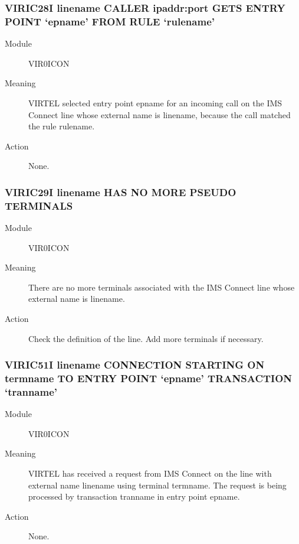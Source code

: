 \documentclass[letterpaper,10pt,english]{sphinxmanual}
\begin{document}
\subsubsection{VIRIC28I linename CALLER ipaddr:port GETS ENTRY POINT ‘epname’ FROM RULE ‘rulename’}
\label{\detokenize{messages:viric28i-linename-caller-ipaddr-port-gets-entry-point-epname-from-rule-rulename}}\begin{description}
\item[{Module}] \leavevmode
VIR0ICON

\item[{Meaning}] \leavevmode
VIRTEL selected entry point epname for an incoming call on the IMS Connect line whose external name is linename, because the call matched the rule rulename.

\item[{Action}] \leavevmode
None.

\end{description}


\subsubsection{VIRIC29I linename HAS NO MORE PSEUDO TERMINALS}
\label{\detokenize{messages:viric29i-linename-has-no-more-pseudo-terminals}}\begin{description}
\item[{Module}] \leavevmode
VIR0ICON

\item[{Meaning}] \leavevmode
There are no more terminals associated with the IMS Connect line whose external name is linename.

\item[{Action}] \leavevmode
Check the definition of the line. Add more terminals if necessary.

\end{description}


\subsubsection{VIRIC51I linename CONNECTION STARTING ON termname TO ENTRY POINT ‘epname’ TRANSACTION ‘tranname’}
\label{\detokenize{messages:viric51i-linename-connection-starting-on-termname-to-entry-point-epname-transaction-tranname}}\begin{description}
\item[{Module}] \leavevmode
VIR0ICON

\item[{Meaning}] \leavevmode
VIRTEL has received a request from IMS Connect on the line with external name linename using terminal termname. The request is being processed by transaction tranname in entry point epname.

\item[{Action}] \leavevmode
None.

\end{description}
\end{document}
